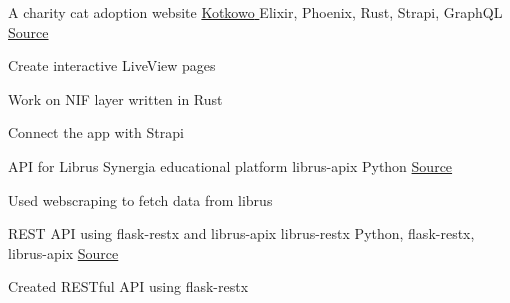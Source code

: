 

\begin{cventries}

  \cventry
    { A charity cat adoption website } %
    {\href{https://kotkowo.ravensiris.xyz}{{Kotkowo}  {\faHome\acvHeaderIconSep}}} %
    {Elixir, Phoenix, Rust, Strapi, GraphQL} %
    {\href{https://github.com/kotkowo/kotkowo}{\faGithubSquare\acvHeaderIconSep Source}} %
    {
      \begin{cvitems} %
        \item {Create interactive LiveView pages}
        \item {Work on NIF layer written in Rust}
        \item {Connect the app with Strapi}
      \end{cvitems}
    } %
  \cventry
    {API for Librus Synergia educational platform} %
    {librus-apix} %
    {Python} %
    {\href{https://github.com/rustysnek/librus-apix}{\faGithubSquare\acvHeaderIconSep Source}} %
    {
      \begin{cvitems} %
        \item {Used webscraping to fetch data from librus}
      \end{cvitems}
    } %


  \cventry
    {REST API using flask-restx and librus-apix} %
    {librus-restx} %
    {Python, flask-restx, librus-apix} %
    {\href{https://github.com/rustysnek/librus-restx}{\faGithubSquare\acvHeaderIconSep Source}} %
    {
      \begin{cvitems} %
        \item {Created RESTful API using flask-restx}
      \end{cvitems}
    } %


\end{cventries}
